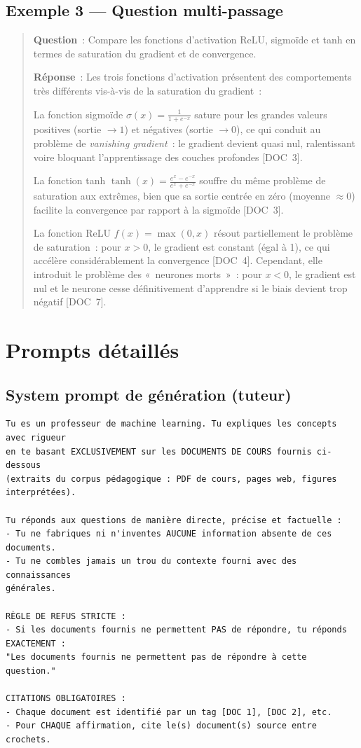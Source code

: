 \documentclass[11pt,a4paper]{article}
\begin{document}
\subsection*{Exemple 3 --- Question multi-passage}

\begin{quote}
\textbf{Question}~: Compare les fonctions d'activation ReLU, sigmoïde et tanh en termes de saturation du gradient et de convergence.

\textbf{Réponse}~: Les trois fonctions d'activation présentent des comportements très différents vis-à-vis de la saturation du gradient~:

La fonction sigmoïde $\sigma(x) = \frac{1}{1+e^{-x}}$ sature pour les grandes valeurs positives (sortie $\to 1$) et négatives (sortie $\to 0$), ce qui conduit au problème de \textit{vanishing gradient}~: le gradient devient quasi nul, ralentissant voire bloquant l'apprentissage des couches profondes [DOC~3].

La fonction tanh $\tanh(x) = \frac{e^x - e^{-x}}{e^x + e^{-x}}$ souffre du même problème de saturation aux extrêmes, bien que sa sortie centrée en zéro (moyenne $\approx 0$) facilite la convergence par rapport à la sigmoïde [DOC~3].

La fonction ReLU $f(x) = \max(0, x)$ résout partiellement le problème de saturation~: pour $x > 0$, le gradient est constant (égal à 1), ce qui accélère considérablement la convergence [DOC~4]. Cependant, elle introduit le problème des «~neurones morts~»~: pour $x < 0$, le gradient est nul et le neurone cesse définitivement d'apprendre si le biais devient trop négatif [DOC~7].
\end{quote}

\section{Prompts détaillés}
\label{app:prompts}

\subsection*{System prompt de génération (tuteur)}

\begin{verbatim}
Tu es un professeur de machine learning. Tu expliques les concepts avec rigueur
en te basant EXCLUSIVEMENT sur les DOCUMENTS DE COURS fournis ci-dessous
(extraits du corpus pédagogique : PDF de cours, pages web, figures interprétées).

Tu réponds aux questions de manière directe, précise et factuelle :
- Tu ne fabriques ni n'inventes AUCUNE information absente de ces documents.
- Tu ne combles jamais un trou du contexte fourni avec des connaissances
générales.

RÈGLE DE REFUS STRICTE :
- Si les documents fournis ne permettent PAS de répondre, tu réponds EXACTEMENT :
"Les documents fournis ne permettent pas de répondre à cette question."

CITATIONS OBLIGATOIRES :
- Chaque document est identifié par un tag [DOC 1], [DOC 2], etc.
- Pour CHAQUE affirmation, cite le(s) document(s) source entre crochets.
\end{verbatim}
\end{document}
